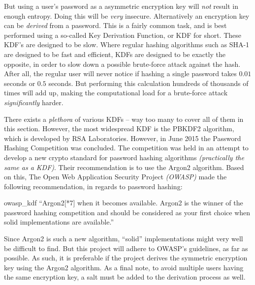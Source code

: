 				But using a user's password as a asymmetric encryption key will \emph{not} result in enough entropy. Doing this will be \emph{very} insecure. Alternatively an encryption key can be \emph{derived} from a password. This is a fairly common task, and is best performed using a so-called Key Derivation Function, or KDF for short. These KDF's are designed to be slow. Where regular hashing algorithms such as SHA-1 are designed to be fast and efficient, KDFs are designed to be exactly the opposite, in order to slow down a possible brute-force attack against the hash. After all, the regular user will never notice if hashing a single password takes $0.01$ seconds or $0.5$ seconds. But performing this calculation hundreds of thousands of times will add up, making the computational load for a brute-force attack \emph{significantly} harder. 

				There exists a \emph{plethora} of various KDFs -- way too many to cover all of them in this section. However, the most widespread KDF is the PBKDF2 algorithm\cite{rfc2898}, which is developed by RSA Laboratories. However, in June 2015 the Password Hashing Competition was concluded\cite{phc}. The competition was held in an attempt to develop a new crypto standard for password hashing algorithms \emph{(practically the same as a KDF)}. Their recommendation is to use the Argon2 algorithm\cite{biryukov2015argon}. Based on this, The Open Web Application Security Project \emph{(OWASP)} made the following recommendation, in regards to password hashing:
				\begin{citequote}{owasp_kdf}
					``Argon2[*7] when it becomes available. Argon2 is the winner of the password hashing competition and should be considered as your first choice when solid implementations are available.''
				\end{citequote}


				Since Argon2 is such a new algorithm, ``solid'' implementations might very well be difficult to find. But this project will adhere to OWASP's guidelines, as far as possible. As such, it is preferable if the project derives the symmetric encryption key using the Argon2 algorithm. As a final note, to avoid multiple users having the same encryption key, a salt must be added to the derivation process as well. 

